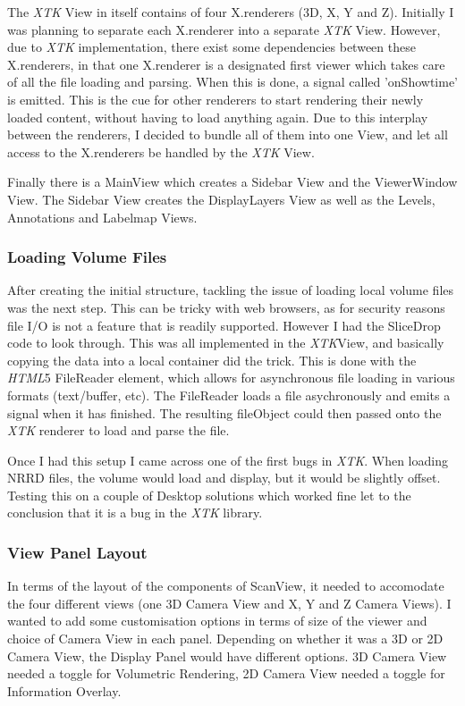 \documentclass[a4paper,11pt,twoside]{article}
\begin{document}
The \textit{XTK} View in itself contains of four X.renderers (3D, X, Y and Z). Initially I was planning to separate each X.renderer into a separate \textit{XTK} View. However, due to \textit{XTK} implementation, there exist some dependencies between these X.renderers, in that one X.renderer is a designated first viewer which takes care of all the file loading and parsing. When this is done, a signal called 'onShowtime' is emitted. This is the cue for other renderers to start rendering their newly loaded content, without having to load anything again. Due to this interplay between the renderers, I decided to bundle all of them into one View, and let all access to the X.renderers be handled by the \textit{XTK} View.

Finally there is a MainView which creates a Sidebar View and the ViewerWindow View. The Sidebar View creates the DisplayLayers View as well as the Levels, Annotations and Labelmap Views.


\subsubsection{Loading Volume Files}

After creating the initial structure, tackling the issue of loading local volume files was the next step. This can be tricky with web browsers, as for security reasons file I/O is not a feature that is readily supported. However I had the SliceDrop code to look through. This was all implemented in the \textit{XTK}View, and basically copying the data into a local container did the trick. This is done with the \textit{HTML}5 FileReader element, which allows for asynchronous file loading in various formats (text/buffer, etc). The FileReader loads a file asychronously and emits a signal when it has finished. The resulting fileObject could then passed onto the \textit{XTK} renderer to load and parse the file.

Once I had this setup I came across one of the first bugs in \textit{XTK}. When loading NRRD files, the volume would load and display, but it would be slightly offset. Testing this on a couple of Desktop solutions which worked fine let to the conclusion that it is a bug in the \textit{XTK} library. 


\subsubsection{View Panel Layout}

In terms of the layout of the components of ScanView, it needed to accomodate the four different views (one 3D Camera View and X, Y and Z Camera Views). I wanted to add some customisation options in terms of size of the viewer and choice of Camera View in each panel. Depending on whether it was a 3D or 2D Camera View, the Display Panel would have different options. 3D Camera View needed a toggle for Volumetric Rendering, 2D Camera View needed a toggle for Information Overlay.
\end{document}
